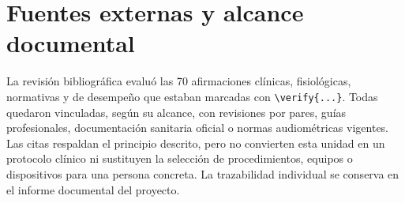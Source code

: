 \section{Fuentes externas y alcance documental}
\label{sec:u8-fuentes}

La revisión bibliográfica evaluó las 70 afirmaciones clínicas, fisiológicas,
normativas y de desempeño que estaban marcadas con
\verb|\verify{...}|. Todas quedaron vinculadas, según su alcance, con
revisiones por pares, guías profesionales, documentación sanitaria oficial o
normas audiométricas vigentes. Las citas respaldan el principio descrito, pero
no convierten esta unidad en un protocolo clínico ni sustituyen la selección
de procedimientos, equipos o dispositivos para una persona concreta. La
trazabilidad individual se conserva en el informe documental del proyecto.
